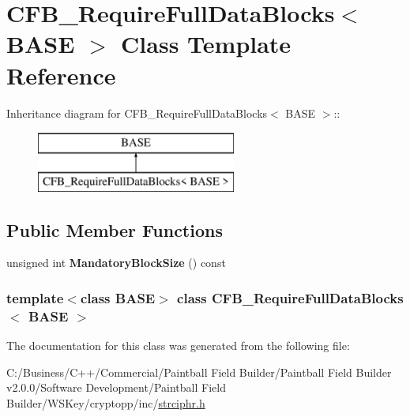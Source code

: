\hypertarget{class_c_f_b___require_full_data_blocks}{
\section{CFB\_\-RequireFullDataBlocks$<$ BASE $>$ Class Template Reference}
\label{class_c_f_b___require_full_data_blocks}
}
Inheritance diagram for CFB\_\-RequireFullDataBlocks$<$ BASE $>$::\begin{figure}[H]
\begin{center}
\leavevmode
\includegraphics[height=2cm]{class_c_f_b___require_full_data_blocks}
\end{center}
\end{figure}
\subsection*{Public Member Functions}
\begin{DoxyCompactItemize}
\item 
\hypertarget{class_c_f_b___require_full_data_blocks_a0ec2ecb192ca296cf12531b8e3f80d7b}{
unsigned int {\bfseries MandatoryBlockSize} () const }
\label{class_c_f_b___require_full_data_blocks_a0ec2ecb192ca296cf12531b8e3f80d7b}

\end{DoxyCompactItemize}
\subsubsection*{template$<$class BASE$>$ class CFB\_\-RequireFullDataBlocks$<$ BASE $>$}



The documentation for this class was generated from the following file:\begin{DoxyCompactItemize}
\item 
C:/Business/C++/Commercial/Paintball Field Builder/Paintball Field Builder v2.0.0/Software Development/Paintball Field Builder/WSKey/cryptopp/inc/\hyperlink{strciphr_8h}{strciphr.h}\end{DoxyCompactItemize}
